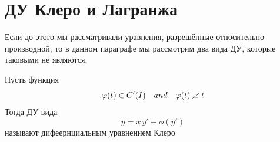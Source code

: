 \section{ДУ Клеро и Лагранжа}

\begin{Note}
    Если до этого мы рассматривали уравнения, разрешённые относительно производной, то в данном параграфе мы рассмотрим два вида ДУ, которые таковыми не являются.
\end{Note}

\begin{Def}
    Пусть функция 
    \[
        \varphi(t) \in C'(I) \quad and \quad \varphi(t)\; \cancel{\equiv}\; t
    \]
    Тогда ДУ вида 
    \[
        y = x\,y' + \phi(y')
    \] 
    называют дифеернциальным уравнением Клеро
\end{Def}

